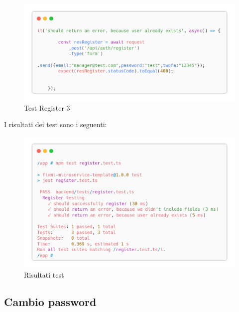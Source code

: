 \documentclass{report}
\begin{document}
\begin{figure}[H]
	\centering\includegraphics[width=1\textwidth]{images/microservizio-autenticazione/tests/register_test_3.png}
	\caption{Test Register 3}
\end{figure}
I risultati dei test sono i seguenti:
\begin{figure}[H]
	\centering\includegraphics[width=1\textwidth]{images/microservizio-autenticazione/tests/register_test_results.png}
	\caption{Risultati test}
\end{figure}
\subsection{Cambio password}
\end{document}

